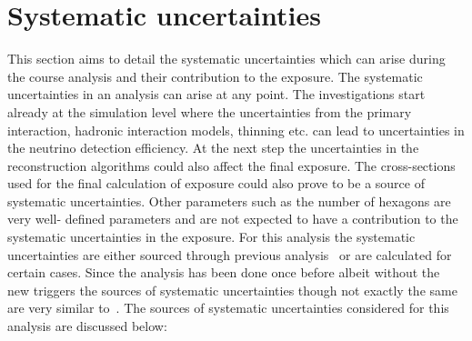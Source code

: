 \section{Systematic uncertainties}
\label{sec:det_uncert}
This section aims to detail the systematic uncertainties which can arise during the course analysis and their contribution to the exposure. The systematic uncertainties in an analysis can arise at any point. The investigations start already at the simulation level where the uncertainties from the primary interaction, hadronic interaction models, thinning etc. can lead to uncertainties in the neutrino detection efficiency. At the next step the uncertainties in the reconstruction algorithms could also affect the final exposure. The cross-sections used for the final calculation of exposure could also prove to be a source of systematic uncertainties. Other parameters such as the number of hexagons are very well- defined parameters and are not expected to have a contribution to the systematic uncertainties in the exposure. For this analysis the systematic uncertainties are either sourced through previous analysis~\cite{gap_systematics} or are calculated for certain cases. Since the analysis has been done once before albeit without the new triggers the sources of systematic uncertainties though not exactly the same are very similar to~\cite{gap_note_2013}. 
The sources of systematic uncertainties considered for this analysis are discussed below:
